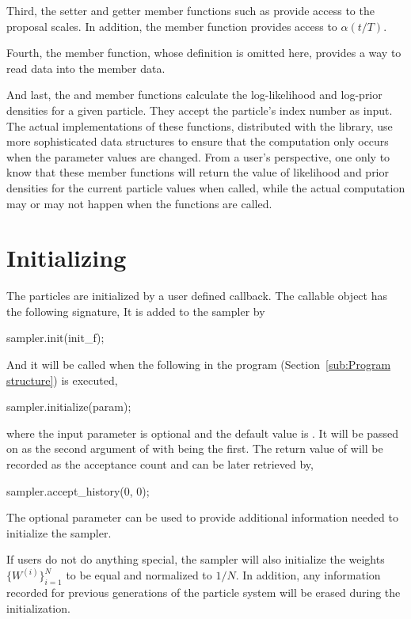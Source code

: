Third, the setter and getter member functions such as  provide access to the proposal scales. In addition, the member function  provides access to $\alpha(t/T)$.

Fourth, the  member function, whose definition is omitted here, provides a way to read data into the  member data.

And last, the  and  member functions calculate the log-likelihood and log-prior densities for a given particle. They accept the particle's index number as input. The actual implementations of these functions, distributed with the library, use more sophisticated data structures to ensure that the computation only occurs when the parameter values are changed. From a user's perspective, one only  to know that these member functions will return the value of likelihood and prior densities for the current particle values when called, while the actual computation may or may not happen when the functions are called.

\section{Initializing}
\label{sec:Initializing}

The particles are initialized by a user defined callback. The callable object has the following signature,
It is added to the sampler by
\begin{cppcode}
sampler.init(init_f);
\end{cppcode}
And it will be called when the following in the program
(Section~\ref{sub:Program structure}) is executed,
\begin{cppcode}
sampler.initialize(param);
\end{cppcode}
where the input parameter  is optional and the default value is . It will be passed on as the second argument of  with  being the first. The return value of  will be recorded as the acceptance count and can be later retrieved by,
\begin{cppcode}
sampler.accept_history(0, 0);
\end{cppcode}
The optional parameter can be used to provide additional information needed to initialize the sampler.

If users do not do anything special, the sampler will also initialize the weights $\{W^{(i)}\}_{i=1}^N$ to be equal and normalized to $1/N$. In addition, any information recorded for previous generations of the particle system will be erased during the initialization.

